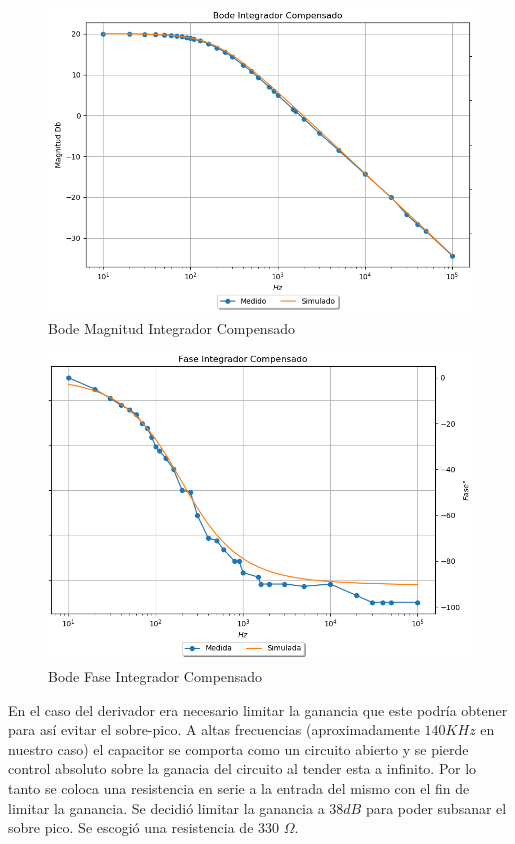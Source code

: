 \begin{figure}[H]
	\centering
	\includegraphics[width=\textwidth]{Ejercicio4/SUPERPOSICION-INTEGRADOR-COMPENSADO} 
	\caption{Bode Magnitud Integrador Compensado}
\end{figure}

\begin{figure}[H]
	\centering
	\includegraphics[width=\textwidth]{Ejercicio4/SUPERPOSICION-FASE-INTEGRADOR-COMPENSADO} 
	\caption{Bode Fase Integrador Compensado}
\end{figure}

En el caso del derivador era necesario limitar la ganancia que este podría obtener para así evitar el sobre-pico. A altas frecuencias (aproximadamente $140KHz$ en nuestro caso) el capacitor se comporta como un circuito abierto y se pierde control absoluto sobre la ganacia del circuito al tender esta a infinito. Por lo tanto se coloca una resistencia en serie a la entrada del mismo con el fin de limitar la ganancia.
Se decidió limitar la ganancia a 38$dB$ para poder subsanar el sobre pico. Se escogió una resistencia de 330 $\Omega$.

